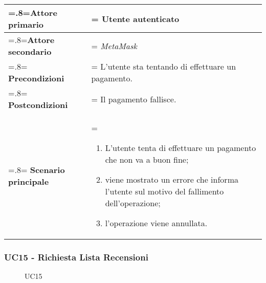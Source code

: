             \begin{center}
                \renewcommand{\arraystretch}{1.5}
                \renewcommand\tabularxcolumn[1]{m{#1}}
                \begin{tabularx}{0.9\textwidth} {
                    >{\hsize=.8\hsize\linewidth=\hsize}X
                    >{\hsize=1.2\hsize\linewidth=\hsize}X}
                    \hline
                    \textbf{Attore primario} & Utente autenticato \\
                    \hline
                    \textbf{Attore secondario} & \textit{MetaMask} \\
                    \hline
                    \textbf{Precondizioni} & L'utente sta tentando di effettuare un pagamento. \\
                    \hline
                    \textbf{Postcondizioni} & Il pagamento fallisce. \\
                    \hline
                    \textbf{Scenario principale} &
                    \begin{enumerate}
                        \item L'utente tenta di effettuare un pagamento che non va a buon fine;
                        \item viene mostrato un errore che informa l'utente sul motivo del fallimento
                        dell'operazione;
                        \item l'operazione viene annullata.
                    \end{enumerate} \\
                    \hline
                \end{tabularx}
            \end{center}

        \subsubsection{UC15 - Richiesta Lista Recensioni}
        \label{UC15}

            \begin{figure}[H]
                \centering
                
                \caption{UC15}
            \end{figure}

